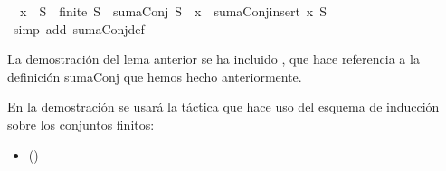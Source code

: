 \begin{isabellebody}
\ {\isachardoublequoteopen}\ x\ {\isasymnotin}\ S\ {\isasymand}\ finite\ S\ {\isasymlongrightarrow}\ sumaConj\ S\ {\isacharplus}\ x\ {\isacharequal}\ sumaConj{\isacharparenleft}insert\ x\ S{\isacharparenright}{\isachardoublequoteclose}\isanewline
%
\isadelimproof
\ \ %
\endisadelimproof
%
\isatagproof
{}\isamarkupfalse%
\ {\isacharparenleft}simp\ add{\isacharcolon}\ sumaConj{\isacharunderscore}def{\isacharparenright}%
\endisatagproof
{\isafoldproof}%
%
\isadelimproof
%
\endisadelimproof
%
\begin{isamarkuptext}%
La demostración del lema anterior se ha incluido
 , que hace referencia a la definición sumaConj que
 hemos hecho anteriormente.


En la demostración se usará la táctica  que hace
  uso del esquema de inducción sobre los conjuntos finitos:
  \begin{itemize}
  \item[] 
 \hfill ()
  \end{itemize} 


\end{isamarkuptext}
\end{isabellebody}
